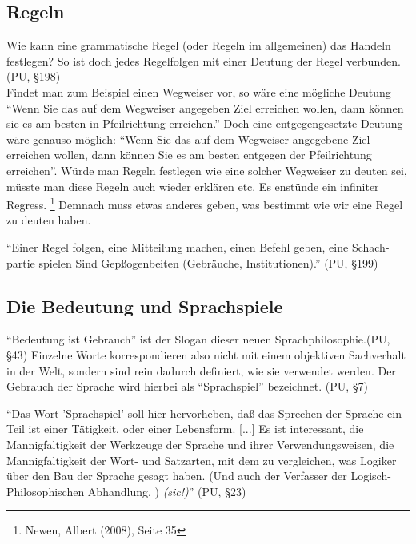 \documentclass[a4paper,12pt]{article}
\begin{document}
\subsection{Regeln}
Wie kann eine grammatische Regel (oder Regeln im allgemeinen) das Handeln festlegen? So ist doch jedes Regelfolgen mit einer Deutung der Regel verbunden. (PU, §198) \\
Findet man zum Beispiel einen Wegweiser vor, so wäre eine mögliche Deutung \enquote{Wenn Sie das auf dem Wegweiser angegeben Ziel erreichen wollen, dann können sie es am besten in Pfeilrichtung erreichen.} Doch eine entgegengesetzte Deutung wäre genauso möglich: \enquote{Wenn Sie das auf dem Wegweiser angegebene Ziel erreichen wollen, dann können Sie es am besten entgegen der Pfeilrichtung erreichen}. Würde man Regeln festlegen wie eine solcher Wegweiser zu deuten sei, müsste man diese Regeln auch wieder erklären etc. Es enstünde ein infiniter Regress. \footnote{Newen, Albert (2008), Seite 35} Demnach muss etwas anderes geben, was bestimmt wie wir eine Regel zu deuten haben.

\begin{displayquote}
\enquote{Einer Regel folgen, eine Mitteilung machen, einen Befehl geben, eine Schach-
partie spielen Sind Gepßogenbeiten (Gebräuche, Institutionen).} (PU, §199)
\end{displayquote}


\subsection{Die Bedeutung und Sprachspiele}
\enquote{Bedeutung ist Gebrauch} ist der Slogan dieser neuen Sprachphilosophie.(PU, §43) Einzelne Worte korrespondieren also nicht mit einem objektiven Sachverhalt in der Welt, sondern sind rein dadurch definiert, wie sie verwendet werden. Der Gebrauch der Sprache wird hierbei als \enquote{Sprachspiel} bezeichnet. (PU, §7)

\begin{displayquote}
\enquote{Das Wort 'Sprachspiel' soll hier hervorheben, daß das Sprechen
der Sprache ein Teil ist einer Tätigkeit, oder einer Lebensform. [...]
Es ist interessant, die Mannigfaltigkeit der Werkzeuge der Sprache
und ihrer Verwendungsweisen, die Mannigfaltigkeit der Wort- und
Satzarten, mit dem zu vergleichen, was Logiker über den Bau der
Sprache gesagt haben. (Und auch der Verfasser der Logisch-Philosophischen Abhandlung. ) \textit{(sic!)}} (PU, §23)
\end{displayquote}
\end{document}
